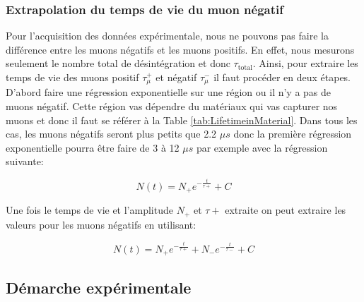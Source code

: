 \documentclass[12pt]{article}
\begin{document}
\subsubsection{Extrapolation du temps de vie du muon négatif}

Pour l'acquisition des données expérimentale, nous ne pouvons pas faire la différence entre les muons négatifs et les muons positifs. En effet, nous mesurons seulement le nombre total de désintégration et donc $\tau_{\text{total}}$. Ainsi, pour extraire les temps de vie des muons positif $\tau^{+}_{\mu}$ et négatif $\tau^{-}_{\mu}$ il faut procéder en deux étapes. D'abord faire une régression exponentielle sur une région ou il n'y a pas de muons négatif. Cette région vas dépendre du matériaux qui vas capturer nos muons et donc il faut se référer à la Table \ref{tab:LifetimeinMaterial}. Dans tous les cas, les muons négatifs seront plus petits que 2.2 $\mu s$ donc la première régression exponentielle pourra être faire de 3 à 12 $\mu s$ par exemple avec la régression suivante:

\[ N(t) = N_{+}e^{-\frac{t}{\tau+}}+C \]

Une fois le temps de vie et l'amplitude $N_{+}$ et $\tau+$ extraite on peut extraire les valeurs pour les muons négatifs en utilisant:

\[ N(t) = N_{+}e^{-\frac{t}{\tau+}}+N_{-}e^{-\frac{t}{\tau-}}+C \]

\subsection{Démarche expérimentale}
\end{document}
